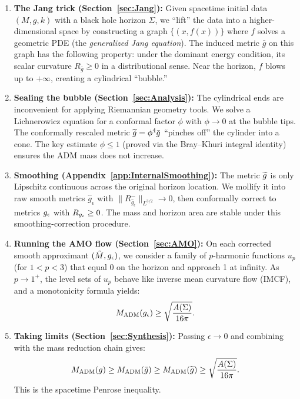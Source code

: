 \begin{enumerate}
\item \textbf{The Jang trick (Section~\ref{sec:Jang}):} Given spacetime initial data $(M,g,k)$ with a black hole horizon $\Sigma$, we ``lift'' the data into a higher-dimensional space by constructing a graph $\{(x, f(x))\}$ where $f$ solves a geometric PDE (the \emph{generalized Jang equation}). The induced metric $\bar{g}$ on this graph has the following property: under the dominant energy condition, its scalar curvature $R_{\bar{g}} \ge 0$ in a distributional sense. Near the horizon, $f$ blows up to $+\infty$, creating a cylindrical ``bubble.''

\item \textbf{Sealing the bubble (Section~\ref{sec:Analysis}):} The cylindrical ends are inconvenient for applying Riemannian geometry tools. We solve a Lichnerowicz equation for a conformal factor $\phi$ with $\phi \to 0$ at the bubble tips. The conformally rescaled metric $\widetilde{g} = \phi^4 \bar{g}$ ``pinches off'' the cylinder into a cone. The key estimate $\phi \le 1$ (proved via the Bray--Khuri integral identity) ensures the ADM mass does not increase.

\item \textbf{Smoothing (Appendix~\ref{app:InternalSmoothing}):} The metric $\widetilde{g}$ is only Lipschitz continuous across the original horizon location. We mollify it into raw smooth metrics $\hat{g}_\epsilon$ with $\|R^-_{\hat{g}_\epsilon}\|_{L^{3/2}}\to0$, then conformally correct to metrics $g_{\epsilon}$ with $R_{g_{\epsilon}}\ge0$. The mass and horizon area are stable under this smoothing-correction procedure.

\item \textbf{Running the AMO flow (Section~\ref{sec:AMO}):} On each corrected smooth approximant $(\tilde{M}, g_{\epsilon})$, we consider a family of $p$-harmonic functions $u_p$ (for $1 < p < 3$) that equal 0 on the horizon and approach 1 at infinity. As $p \to 1^+$, the level sets of $u_p$ behave like inverse mean curvature flow (IMCF), and a monotonicity formula yields:
\[
M_{\mathrm{ADM}}(g_{\epsilon}) \ge \sqrt{\frac{A(\Sigma)}{16\pi}}.
\]

\item \textbf{Taking limits (Section~\ref{sec:Synthesis}):} Passing $\epsilon \to 0$ and combining with the mass reduction chain gives:
\[
M_{\mathrm{ADM}}(g) \ge M_{\mathrm{ADM}}(\bar{g}) \ge M_{\mathrm{ADM}}(\widetilde{g}) \ge \sqrt{\frac{A(\Sigma)}{16\pi}}.
\]
This is the spacetime Penrose inequality.
\end{enumerate}

